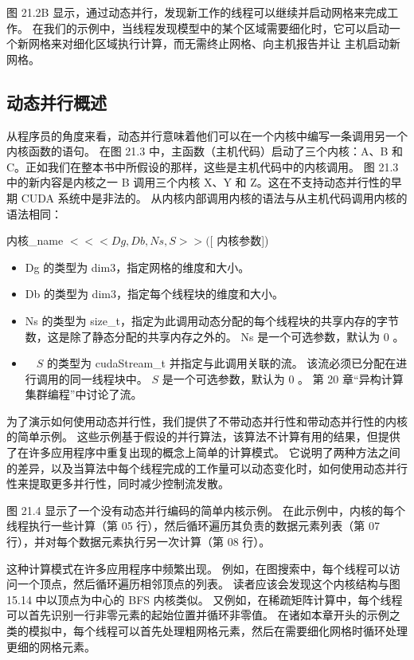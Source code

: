 图 21.2B 显示，通过动态并行，发现新工作的线程可以继续并启动网格来完成工作。 在我们的示例中，当线程发现模型中的某个区域需要细化时，它可以启动一个新网格来对细化区域执行计算，而无需终止网格、向主机报告并让 主机启动新网格。

\subsection{动态并行概述}
从程序员的角度来看，动态并行意味着他们可以在一个内核中编写一条调用另一个内核函数的语句。 在图 21.3 中，主函数（主机代码）启动了三个内核：A、B 和 C。正如我们在整本书中所假设的那样，这些是主机代码中的内核调用。 图 21.3 中的新内容是内核之一 B 调用三个内核 X、Y 和 Z。这在不支持动态并行性的早期 CUDA 系统中是非法的。 从内核内部调用内核的语法与从主机代码调用内核的语法相同：

内核\_name $<<<D g, D b, N s, S>>([$ 内核参数])

\begin{itemize}
   \item Dg 的类型为 dim3，指定网格的维度和大小。

   \item Db 的类型为 dim3，指定每个线程块的维度和大小。

   \item Ns 的类型为 size\_t，指定为此调用动态分配的每个线程块的共享内存的字节数，这是除了静态分配的共享内存之外的。 Ns 是一个可选参数，默认为 0 。

   \item $\quad S$ 的类型为 cudaStream\_t 并指定与此调用关联的流。 该流必须已分配在进行调用的同一线程块中。 $S$ 是一个可选参数，默认为 0 。 第 20 章“异构计算集群编程”中讨论了流。
\end{itemize}

为了演示如何使用动态并行性，我们提供了不带动态并行性和带动态并行性的内核的简单示例。 这些示例基于假设的并行算法，该算法不计算有用的结果，但提供了在许多应用程序中重复出现的概念上简单的计算模式。 它说明了两种方法之间的差异，以及当算法中每个线程完成的工作量可以动态变化时，如何使用动态并行性来提取更多并行性，同时减少控制流发散。

图 21.4 显示了一个没有动态并行编码的简单内核示例。 在此示例中，内核的每个线程执行一些计算（第 05 行），然后循环遍历其负责的数据元素列表（第 07 行），并对每个数据元素执行另一次计算（第 08 行）。

这种计算模式在许多应用程序中频繁出现。 例如，在图搜索中，每个线程可以访问一个顶点，然后循环遍历相邻顶点的列表。 读者应该会发现这个内核结构与图 15.14 中以顶点为中心的 BFS 内核类似。 又例如，在稀疏矩阵计算中，每个线程可以首先识别一行非零元素的起始位置并循环非零值。 在诸如本章开头的示例之类的模拟中，每个线程可以首先处理粗网格元素，然后在需要细化网格时循环处理更细的网格元素。

